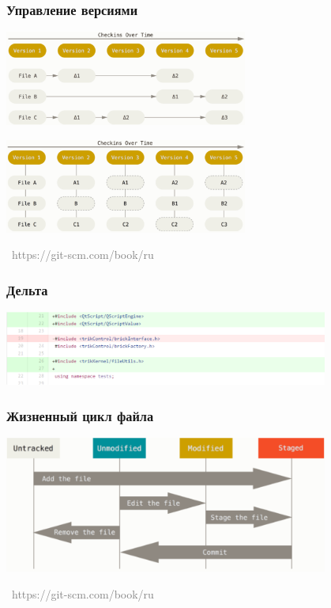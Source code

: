 \documentclass[xetex,mathserif,serif]{beamer}
\newcommand{\attribution}[1] {
\vspace{-5mm}\begin{flushright}\begin{scriptsize}\textcolor{gray}{\textcopyright\, #1}\end{scriptsize}\end{flushright}
}
\begin{document}
	\begin{frame}
		\frametitle{Управление версиями}
		\begin{center}
			\includegraphics[width=0.6\textwidth]{deltaVersioning.png}

			\vspace{5mm}
			\includegraphics[width=0.6\textwidth]{snapshotVersioning.png}
			\attribution{https://git-scm.com/book/ru}
		\end{center}
	\end{frame}

	\begin{frame}
		\frametitle{Дельта}
		\begin{center}
			\includegraphics[width=0.8\textwidth]{delta.png}
		\end{center}
	\end{frame}

	\begin{frame}
		\frametitle{Жизненный цикл файла}
		\begin{center}
			\includegraphics[width=0.8\textwidth]{fileLifeCycle.png}
			\attribution{https://git-scm.com/book/ru}
		\end{center}
	\end{frame}
\end{document}
